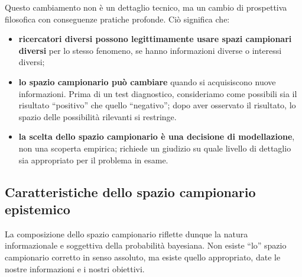 \documentclass[
  italian,
  letterpaper,
  a4paper,
  11pt,
  open=any]{scrbook}
\theoremstyle{plain}
\theoremstyle{definition}
\theoremstyle{definition}
\theoremstyle{remark}
\begin{document}
Questo cambiamento non è un dettaglio tecnico, ma un cambio di
prospettiva filosofica con conseguenze pratiche profonde. Ciò significa
che:

\begin{itemize}
\item
  \textbf{ricercatori diversi possono legittimamente usare spazi
  campionari diversi} per lo stesso fenomeno, se hanno informazioni
  diverse o interessi diversi;
\item
  \textbf{lo spazio campionario può cambiare} quando si acquisiscono
  nuove informazioni. Prima di un test diagnostico, consideriamo come
  possibili sia il risultato ``positivo'' che quello ``negativo''; dopo
  aver osservato il risultato, lo spazio delle possibilità rilevanti si
  restringe.
\item
  \textbf{la scelta dello spazio campionario è una decisione di
  modellazione}, non una scoperta empirica; richiede un giudizio su
  quale livello di dettaglio sia appropriato per il problema in esame.
\end{itemize}

\subsection{Caratteristiche dello spazio campionario
epistemico}\label{caratteristiche-dello-spazio-campionario-epistemico}

La composizione dello spazio campionario riflette dunque la natura
informazionale e soggettiva della probabilità bayesiana. Non esiste
``lo'' spazio campionario corretto in senso assoluto, ma esiste quello
appropriato, date le nostre informazioni e i nostri obiettivi.
\end{document}
